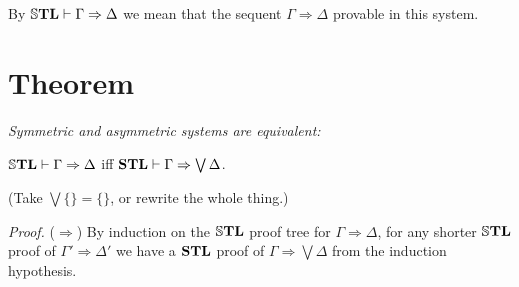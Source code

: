 \documentclass[a4paper, 12pt]{paper}
\begin{document}
By $\mathbb{S}\mathbf{TL} \vdash \Gamma \Rightarrow \Delta$ we mean that the sequent $\Gamma \Rightarrow \Delta$ provable in this system.

\section{Theorem} \textit{Symmetric and asymmetric systems are equivalent:} 

\quad $\mathbb{S}\mathbf{TL} \vdash \Gamma \Rightarrow \Delta$ \quad iff \quad $\mathbf{STL} \vdash \Gamma \Rightarrow \bigvee \Delta$.

(Take $\bigvee \{\} = \{\}$, or rewrite the whole thing.)

\emph{Proof.} ($\Rightarrow$) By induction on the $\mathbb{S}\mathbf{TL}$ proof tree for $\Gamma \Rightarrow \Delta$, for any shorter $\mathbb{S}\mathbf{TL}$ proof of $\Gamma' \Rightarrow \Delta'$ we have a $\mathbf{STL}$ proof of $\Gamma \Rightarrow \bigvee \Delta$ from the induction hypothesis.
\end{document}
